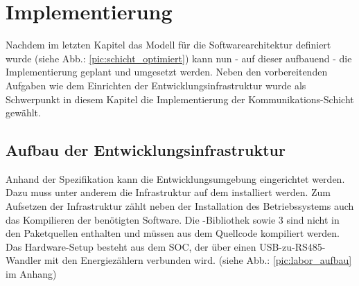 \documentclass[Bachelorarbeit.tex]{subfiles}
\begin{document}
\chapter{Implementierung}
\label{chap:implementierung}
Nachdem im letzten Kapitel das Modell für die Softwarearchitektur definiert wurde (siehe Abb.: \ref{pic:schicht_optimiert}) kann nun - auf dieser aufbauend - die Implementierung geplant und umgesetzt werden. 
Neben den vorbereitenden Aufgaben wie dem Einrichten der Entwicklungsinfrastruktur wurde als Schwerpunkt in diesem Kapitel die  Implementierung der Kommunikations-Schicht gewählt.

\section{Aufbau der Entwicklungsinfrastruktur}
\label{sec:aufbau_der_entwicklunsinfrastruktur}
Anhand der Spezifikation kann die Entwicklungsumgebung eingerichtet werden. 
Dazu muss unter anderem die Infrastruktur auf dem  installiert werden. Zum 
Aufsetzen der Infrastruktur zählt neben der Installation des Betriebssystems auch 
das Kompilieren der benötigten Software. Die -Bibliothek sowie 3 
sind nicht in den Paketquellen enthalten und müssen aus dem Quellcode kompiliert 
werden.\\
Das Hardware-Setup besteht aus dem \ac{SOC}, der über einen USB-zu-RS485-Wandler mit den Energiezählern verbunden wird. (siehe Abb.: \ref{pic:labor_aufbau} im Anhang)
\end{document}
